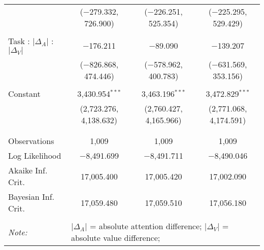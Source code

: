 \begin{table}[h]
\begin{tabular}{@{\extracolsep{5pt}}lccc}
  & ($-$279.332, 726.900) & ($-$226.251, 525.354) & ($-$225.295, 529.429) \\ 
  & & & \\ 
 Task : $\vert\Delta_A\vert$ :  $\vert\Delta_V\vert$ & $-$176.211 & $-$89.090 & $-$139.207 \\ 
  & ($-$826.868, 474.446) & ($-$578.962, 400.783) & ($-$631.569, 353.156) \\ 
  & & & \\ 
 Constant & 3,430.954$^{***}$ & 3,463.196$^{***}$ & 3,472.829$^{***}$ \\ 
  & (2,723.276, 4,138.632) & (2,760.427, 4,165.966) & (2,771.068, 4,174.591) \\ 
  & & & \\ 
\hline \\[-1.8ex] 
Observations & 1,009 & 1,009 & 1,009 \\ 
Log Likelihood & $-$8,491.699 & $-$8,491.711 & $-$8,490.046 \\ 
Akaike Inf. Crit. & 17,005.400 & 17,005.420 & 17,002.090 \\ 
Bayesian Inf. Crit. & 17,059.480 & 17,059.510 & 17,056.180 \\ 
\hline 
\hline \\[-1.8ex] 
\textit{Note:}  & \multicolumn{3}{l}{\footnotesize $\vert\Delta_A\vert$ = absolute attention difference; $\vert\Delta_V\vert$ = absolute value difference; } \\ 
\end{tabular} 
\end{table} 

